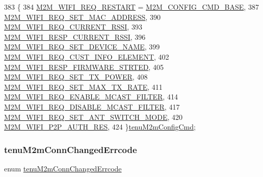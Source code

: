 \begin{DoxyCode}
383              \{
384     \hyperlink{group__WlanEnums_gga57466b36df595c593e7ccc9892e14b20aed0bba9156ed61dc387ed73844ae2074}{M2M\_WIFI\_REQ\_RESTART} = \hyperlink{group__WlanDefines_ga8cb2c74aa2cc33e2191ed3aa06ab5e9d}{M2M\_CONFIG\_CMD\_BASE},
387     \hyperlink{group__WlanEnums_gga57466b36df595c593e7ccc9892e14b20a4c2ce5f4fc68f7958e12632e45587b31}{M2M\_WIFI\_REQ\_SET\_MAC\_ADDRESS},
390     \hyperlink{group__WlanEnums_gga57466b36df595c593e7ccc9892e14b20a53bc10f0a87f11ba6b111321d362fc66}{M2M\_WIFI\_REQ\_CURRENT\_RSSI},
393     \hyperlink{group__WlanEnums_gga57466b36df595c593e7ccc9892e14b20ae2f28d3ff5c4356502abfc26d8f6e5f1}{M2M\_WIFI\_RESP\_CURRENT\_RSSI},
396     \hyperlink{group__WlanEnums_gga57466b36df595c593e7ccc9892e14b20a9c8b2c2704ec40baffa44f95e1e3a88e}{M2M\_WIFI\_REQ\_SET\_DEVICE\_NAME},
399     \hyperlink{group__WlanEnums_gga57466b36df595c593e7ccc9892e14b20a88cfe379491a57588e4b16271390cedb}{M2M\_WIFI\_REQ\_CUST\_INFO\_ELEMENT},
402     \hyperlink{group__WlanEnums_gga57466b36df595c593e7ccc9892e14b20a71745d4c66d95eca1782fa6fa3ba0cac}{M2M\_WIFI\_RESP\_FIRMWARE\_STRTED},
405     \hyperlink{group__WlanEnums_gga57466b36df595c593e7ccc9892e14b20a712d36cb116cadd83ccedc2be4dd586c}{M2M\_WIFI\_REQ\_SET\_TX\_POWER},
408     \hyperlink{group__WlanEnums_gga57466b36df595c593e7ccc9892e14b20a031094b619d95c19dc52b31da7c36730}{M2M\_WIFI\_REQ\_SET\_MAX\_TX\_RATE},
411     \hyperlink{group__WlanEnums_gga57466b36df595c593e7ccc9892e14b20a7109ec18cea640c14a521d3d0cdeb1e7}{M2M\_WIFI\_REQ\_ENABLE\_MCAST\_FILTER},
414     \hyperlink{group__WlanEnums_gga57466b36df595c593e7ccc9892e14b20add5f05bfabd486ac096b000dfab1fea1}{M2M\_WIFI\_REQ\_DISABLE\_MCAST\_FILTER},
417     \hyperlink{group__WlanEnums_gga57466b36df595c593e7ccc9892e14b20afaf4d6ffcf17a9531aba6d27f96f85be}{M2M\_WIFI\_REQ\_SET\_ANT\_SWITCH\_MODE},
420     \hyperlink{group__WlanEnums_gga57466b36df595c593e7ccc9892e14b20a3f2996edd7885e485b8c52bcfd6f6ccd}{M2M\_WIFI\_P2P\_AUTH\_RES},
424 \}\hyperlink{group__WlanEnums_ga57466b36df595c593e7ccc9892e14b20}{tenuM2mConfigCmd};
\end{DoxyCode}
\mbox{\label{group__WlanEnums_ga649d744eaabbf30bce22e30af0eec24d}} 
\subsubsection{\texorpdfstring{tenu\+M2m\+Conn\+Changed\+Errcode}{tenuM2mConnChangedErrcode}}
{\footnotesize\ttfamily enum \hyperlink{group__WlanEnums_ga649d744eaabbf30bce22e30af0eec24d}{tenu\+M2m\+Conn\+Changed\+Errcode}}



